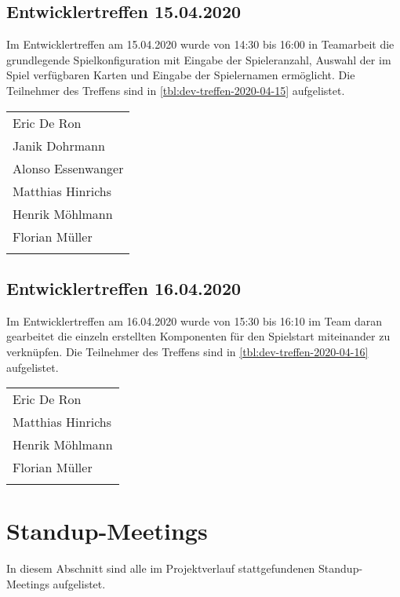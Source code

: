 	\subsection{Entwicklertreffen 15.04.2020}
		Im Entwicklertreffen am 15.04.2020 wurde von 14:30 bis 16:00 in Teamarbeit die grundlegende Spielkonfiguration mit Eingabe der Spieleranzahl, Auswahl der im Spiel verfügbaren Karten und Eingabe der Spielernamen ermöglicht. Die Teilnehmer des Treffens sind in \autoref{tbl:dev-treffen-2020-04-15} aufgelistet.
		\begin{tabularx}{0.75\textwidth}{l}
			\hline
			\endhead
			Eric De Ron\\
			Janik Dohrmann\\
			Alonso Essenwanger\\
			Matthias Hinrichs\\
			Henrik Möhlmann\\
			Florian Müller\\
			\hline
			\caption{Teilnehmer 15.04.2020}
			\label{tbl:dev-treffen-2020-04-15}
		\end{tabularx}
	\subsection{Entwicklertreffen 16.04.2020}
		Im Entwicklertreffen am 16.04.2020 wurde von 15:30 bis 16:10 im Team daran gearbeitet die einzeln erstellten Komponenten für den Spielstart miteinander zu verknüpfen. Die Teilnehmer des Treffens sind in \autoref{tbl:dev-treffen-2020-04-16} aufgelistet.
		\begin{tabularx}{0.75\textwidth}{l}
			\hline
			\endhead
			Eric De Ron\\
			Matthias Hinrichs\\
			Henrik Möhlmann\\
			Florian Müller\\
			\hline
			\caption{Teilnehmer 16.04.2020}
			\label{tbl:dev-treffen-2020-04-16}
		\end{tabularx}
\captionsetup[table]{list=no}
\section{Standup-Meetings}
\label{sec:standup}
In diesem Abschnitt sind alle im Projektverlauf stattgefundenen Standup-Meetings aufgelistet.
